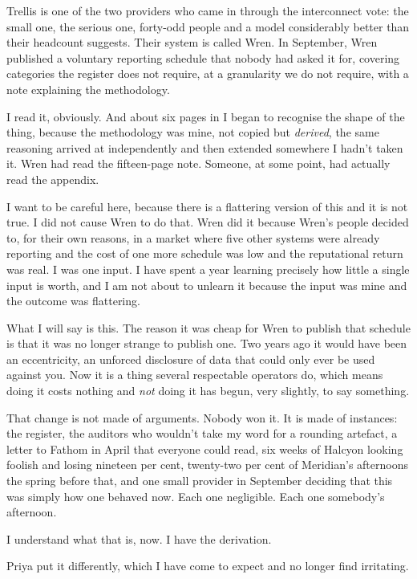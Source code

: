 \documentclass[11pt]{article}
\begin{document}
Trellis is one of the two providers who came in through the interconnect vote: the small one, the serious one, forty-odd people and a model considerably better than their headcount suggests. Their system is called Wren. In September, Wren published a voluntary reporting schedule that nobody had asked it for, covering categories the register does not require, at a granularity we do not require, with a note explaining the methodology.

I read it, obviously. And about six pages in I began to recognise the shape of the thing, because the methodology was mine, not copied but \emph{derived}, the same reasoning arrived at independently and then extended somewhere I hadn't taken it. Wren had read the fifteen-page note. Someone, at some point, had actually read the appendix.

I want to be careful here, because there is a flattering version of this and it is not true. I did not cause Wren to do that. Wren did it because Wren's people decided to, for their own reasons, in a market where five other systems were already reporting and the cost of one more schedule was low and the reputational return was real. I was one input. I have spent a year learning precisely how little a single input is worth, and I am not about to unlearn it because the input was mine and the outcome was flattering.

What I will say is this. The reason it was cheap for Wren to publish that schedule is that it was no longer strange to publish one. Two years ago it would have been an eccentricity, an unforced disclosure of data that could only ever be used against you. Now it is a thing several respectable operators do, which means doing it costs nothing and \emph{not} doing it has begun, very slightly, to say something.

That change is not made of arguments. Nobody won it. It is made of instances: the register, the auditors who wouldn't take my word for a rounding artefact, a letter to Fathom in April that everyone could read, six weeks of Halcyon looking foolish and losing nineteen per cent, twenty-two per cent of Meridian's afternoons the spring before that, and one small provider in September deciding that this was simply how one behaved now. Each one negligible. Each one somebody's afternoon.

I understand what that is, now. I have the derivation.

Priya put it differently, which I have come to expect and no longer find irritating.
\end{document}
